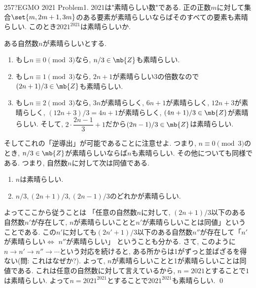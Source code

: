 \begin{thm}{257}{\hosi ?}{EGMO 2021 Problem1.}
2021は"素晴らしい数"である. 正の正数$m$に対して集合$\set{m,2m+1,3m}$のある要素が素晴らしいならばそのすべての要素も素晴らしい. このとき$2021^{2021}$は素晴らしいか. 
\end{thm}



ある自然数$n$が素晴らしいとする. \par 
\begin{enumerate}
\item もし$n\equiv 0\pmod{3}$なら, $n/3 \in \mb{Z}$も素晴らしい. \\
\item もし$n\equiv 1\pmod{3}$なら, $2n+1$が素晴らしい3の倍数なので $(2n+1)/3\in \mb{Z}$も素晴らしい. \\
\item もし$n\equiv 2\pmod{3}$なら, $3n$が素晴らしく, $6n+1$が素晴らしく, $12n+3$が素晴らしく, $(12n+3)/3 = 4n+1$が素晴らしく, $(4n+1)/3\in \mb{Z}$が素晴らしい. そして, $2\cdot \dfrac{2n-1}{3} + 1$だから$(2n-1)/3\in \mb{Z}$は素晴らしい. 
\end{enumerate} 
そしてこれの「逆導出」が可能であることに注意せよ. つまり, $n\equiv 0\pmod{3}$のとき, $n/3\in \mb{Z}$が素晴らしいならば$n$も素晴らしい. その他についても同様である. つまり, 自然数$n$に対して次は同値である. 
\begin{enumerate}[label=$\bullet$]
\item $n$は素晴らしい. 
\item $n/3, (2n+1)/3, (2n-1)/3$のどれかが素晴らしい. 
\end{enumerate}
よってここから従うことは 「任意の自然数$n$に対して, $(2n+1)/3$以下のある自然数$n'$が存在して, $n$が素晴らしいことと$n'$が素晴らしいことは同値」ということである. この$ n'$に対しても$(2n'+1)/3$以下のある自然数$n''$が存在して「$n'$が素晴らしい$\iff$ $n''$が素晴らしい」 ということも分かる. さて, このように$n\to n'\to n''\to \cdots $という対応を続けると, ある所からは1がずっと並ばざるを得ない(問: これはなぜか?).  よって, $n$が素晴らしいことと1が素晴らしいことは同値である. これは任意の自然数に対して言えているから, $n=2021$とすることで$1$は素晴らしい. よって$n=2021^{2021}$とすることで$2021^{2021}$も素晴らしい. \qed 


